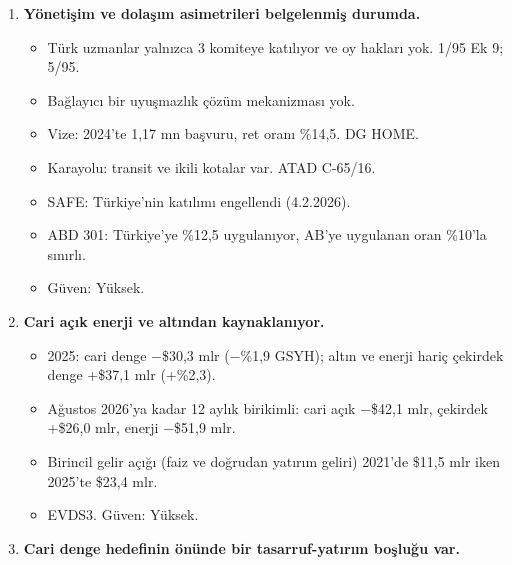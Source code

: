 \begin{enumerate}
  \begin{itemize}
  \tightlist
  \item
    Kapsam: AB'nin STA'sı olup Türkiye'nin olmadığı 22 pazar grubu (33 ülke).
  \item
    Türk ihracatı yılda ≈\$1,5 mlr MFN vergisi ödüyor; ağırlıklı ortalama \%8,6.
  \item
    Aynı pazarlarda AB ihracatçılarının tercih avantajı ≈\$24,8 mlr (üst sınır). \$6,5 mlr'ı Hindistan, Endonezya ve Avustralya anlaşmaları yürürlüğe girince eklenecek.
  \item
    Bu ortaklardan Türkiye'nin ithalatı \$30,2 mlr. Çıkış sonrası Türkiye'nin kendi STA'ları için en büyük kaldıraç bu.
  \item
    \etiketT{} BACI 2024, WITS. Güven: Orta.
  \end{itemize}
\item
  \textbf{Yönetişim ve dolaşım asimetrileri belgelenmiş durumda.}

  \begin{itemize}
  \tightlist
  \item
    Türk uzmanlar yalnızca 3 komiteye katılıyor ve oy hakları yok. \etiketV{} 1/95 Ek 9; 5/95.
  \item
    Bağlayıcı bir uyuşmazlık çözüm mekanizması yok.
  \item
    Vize: 2024'te 1,17 mn başvuru, ret oranı \%14,5. \etiketV{} DG HOME.
  \item
    Karayolu: transit ve ikili kotalar var. \etiketV{} ATAD C-65/16.
  \item
    SAFE: Türkiye'nin katılımı engellendi (4.2.2026). \etiketV{}
  \item
    ABD 301: Türkiye'ye \%12,5 uygulanıyor, AB'ye uygulanan oran \%10'la sınırlı. \etiketV{}
  \item
    Güven: Yüksek.
  \end{itemize}
\item
  \textbf{Cari açık enerji ve altından kaynaklanıyor.}

  \begin{itemize}
  \tightlist
  \item
    2025: cari denge −\$30,3 mlr (−\%1,9 GSYH); altın ve enerji hariç çekirdek denge +\$37,1 mlr (+\%2,3).
  \item
    Ağustos 2026'ya kadar 12 aylık birikimli: cari açık −\$42,1 mlr, çekirdek +\$26,0 mlr, enerji −\$51,9 mlr.
  \item
    Birincil gelir açığı (faiz ve doğrudan yatırım geliri) 2021'de \$11,5 mlr iken 2025'te \$23,4 mlr.
  \item
    \etiketV{} EVDS3. Güven: Yüksek.
  \end{itemize}
\item
  \textbf{Cari denge hedefinin önünde bir tasarruf-yatırım boşluğu var.}


\end{enumerate}
